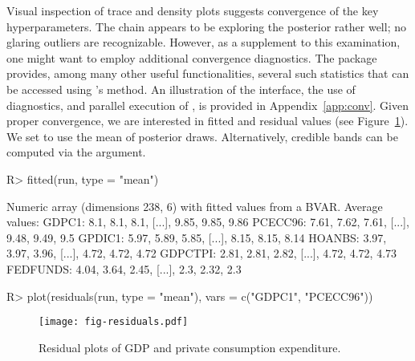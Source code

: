 \documentclass[article,nojss]{jss} %
\begin{document}
Visual inspection of trace and density plots suggests convergence of the key hyperparameters. The chain appears to be exploring the posterior rather well; no glaring outliers are recognizable.
However, as a supplement to this examination, one might want to employ additional convergence diagnostics. The  package provides, among many other useful functionalities, several such statistics that can be accessed using 's  method. An illustration of the interface, the use of diagnostics, and parallel execution of , is provided in Appendix~\ref{app:conv}.
Given proper convergence, we are interested in fitted and residual values (see Figure~\ref{fig:residuals}). We set  to use the mean of posterior draws. Alternatively, credible bands can be computed via the  argument.

\begin{Schunk}
\begin{Sinput}
R> fitted(run, type = "mean")
\end{Sinput}
\begin{Soutput}
Numeric array (dimensions 238, 6) with fitted values from a BVAR.
Average values:
	GDPC1: 8.1, 8.1, 8.1, [...], 9.85, 9.85, 9.86
	PCECC96: 7.61, 7.62, 7.61, [...], 9.48, 9.49, 9.5
	GPDIC1: 5.97, 5.89, 5.85, [...], 8.15, 8.15, 8.14
	HOANBS: 3.97, 3.97, 3.96, [...], 4.72, 4.72, 4.72
	GDPCTPI: 2.81, 2.81, 2.82, [...], 4.72, 4.72, 4.73
	FEDFUNDS: 4.04, 3.64, 2.45, [...], 2.3, 2.32, 2.3
\end{Soutput}
\end{Schunk}


\begin{Schunk}
\begin{Sinput}
R> plot(residuals(run, type = "mean"), vars = c("GDPC1", "PCECC96"))
\end{Sinput}
\end{Schunk}

\begin{figure}[!ht]
  \centering
  \texttt{[image: fig-residuals.pdf]}
  \caption{Residual plots of GDP and private consumption expenditure.}
  \label{fig:residuals}
\end{figure}
\end{document}
